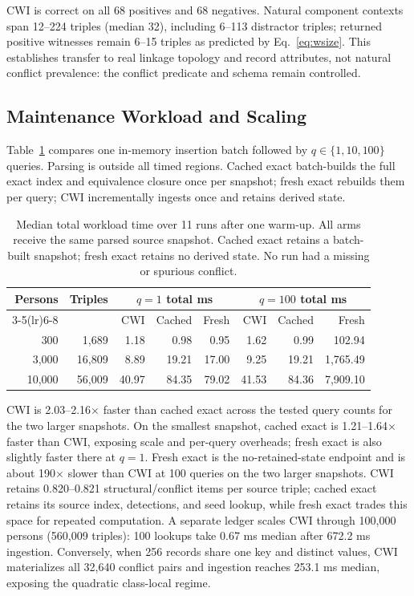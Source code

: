 \documentclass[letterpaper]{article} %
\newcommand{\cwi}{\textsc{CWI}}
\begin{document}
\cwi{} is correct on all 68 positives and 68 negatives.  Natural component
contexts span 12--224 triples (median 32), including 6--113 distractor triples;
returned positive witnesses remain 6--15 triples as predicted by
Eq.~\ref{eq:wsize}.  This establishes transfer to real linkage topology and
record attributes, not natural conflict prevalence: the conflict predicate
and schema remain controlled.

\subsection{Maintenance Workload and Scaling}

Table~\ref{tab:scale} compares one in-memory insertion batch followed by
$q\in\{1,10,100\}$ queries.  Parsing is outside all timed regions.  Cached
exact batch-builds the full exact index and equivalence closure once per
snapshot; fresh exact rebuilds them per query; \cwi{} incrementally ingests
once and retains derived state.

\begin{table}[t]
\centering
\small
\setlength{\tabcolsep}{4.2pt}
\begin{tabular}{rrrrrrrr}
\toprule
Persons & Triples & \multicolumn{3}{c}{$q=1$ total ms} &
\multicolumn{3}{c}{$q=100$ total ms} \\
\cmidrule(lr){3-5}\cmidrule(lr){6-8}
& & \cwi{} & Cached & Fresh & \cwi{} & Cached & Fresh \\
\midrule
300    & 1,689  & 1.18 & 0.98 & 0.95 & 1.62 & 0.99 & 102.94 \\
3,000  & 16,809 & 8.89 & 19.21 & 17.00 & 9.25 & 19.21 & 1,765.49 \\
10,000 & 56,009 & 40.97 & 84.35 & 79.02 & 41.53 & 84.36 & 7,909.10 \\
\bottomrule
\end{tabular}
\caption{Median total workload time over 11 runs after one warm-up.  All arms
receive the same parsed source snapshot.  Cached exact retains a batch-built
snapshot; fresh exact retains no derived state.  No run had a missing or
spurious conflict.}
\label{tab:scale}
\end{table}

\cwi{} is 2.03--2.16$\times$ faster than cached exact across the tested query
counts for the two larger snapshots.  On the smallest snapshot, cached exact
is 1.21--1.64$\times$ faster than \cwi{}, exposing scale and per-query
overheads; fresh exact is also slightly faster there at $q=1$.  Fresh exact
is the no-retained-state endpoint and is about 190$\times$ slower than \cwi{}
at 100 queries on the two larger snapshots.
\cwi{} retains 0.820--0.821 structural/conflict items per source triple;
cached exact retains its source index, detections, and seed lookup, while
fresh exact trades this space for repeated computation.  A separate ledger scales \cwi{} through
100,000 persons (560,009 triples): 100 lookups take 0.67 ms median after
672.2 ms ingestion.  Conversely, when 256 records share one key and distinct
values, \cwi{} materializes all 32,640 conflict pairs and ingestion reaches
253.1 ms median, exposing the quadratic class-local regime.
\end{document}
